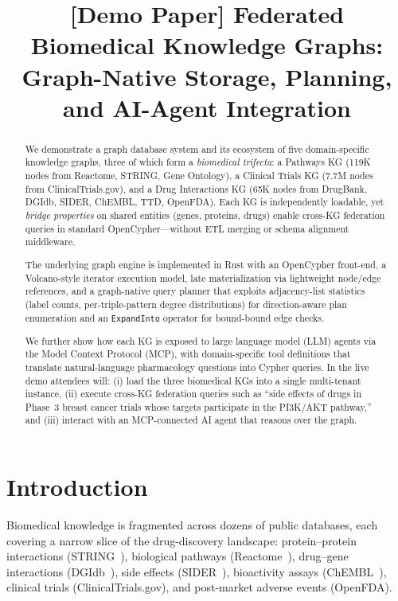 \documentclass[sigconf, anonymous, review]{acmart}
\begin{document}
\title{[Demo Paper] Federated Biomedical Knowledge Graphs:\\Graph-Native Storage, Planning, and AI-Agent Integration}

\begin{abstract}
We demonstrate a graph database system and its ecosystem of five
domain-specific knowledge graphs, three of which form a \emph{biomedical
trifecta}: a Pathways KG (119K nodes from Reactome, STRING, Gene
Ontology), a Clinical Trials KG (7.7M nodes from ClinicalTrials.gov),
and a Drug Interactions KG (65K nodes from DrugBank, DGIdb, SIDER,
ChEMBL, TTD, OpenFDA).  Each KG is independently loadable, yet
\emph{bridge properties} on shared entities (genes, proteins, drugs)
enable cross-KG federation queries in standard OpenCypher---without
ETL merging or schema alignment middleware.

The underlying graph engine is implemented in Rust with an
OpenCypher front-end, a Volcano-style iterator execution model,
late materialization via lightweight node/edge references, and a
graph-native query planner that exploits adjacency-list statistics
(label counts, per-triple-pattern degree distributions) for
direction-aware plan enumeration and an \texttt{ExpandInto}
operator for bound-bound edge checks.

We further show how each KG is exposed to large language model
(LLM) agents via the Model Context Protocol (MCP), with
domain-specific tool definitions that translate natural-language
pharmacology questions into Cypher queries.  In the live demo
attendees will: (i) load the three biomedical KGs into a single
multi-tenant instance, (ii) execute cross-KG federation queries
such as ``side effects of drugs in Phase~3 breast cancer trials
whose targets participate in the PI3K/AKT pathway,'' and
(iii) interact with an MCP-connected AI agent that reasons over
the graph.
\end{abstract}

\maketitle

\section{Introduction}\label{sec:intro}

Biomedical knowledge is fragmented across dozens of public databases,
each covering a narrow slice of the drug-discovery landscape:
protein--protein interactions (STRING~\cite{szklarczyk2023string}),
biological pathways (Reactome~\cite{gillespie2022reactome}), drug--gene
interactions (DGIdb~\cite{freshour2021dgidb}), side effects
(SIDER~\cite{kuhn2016sider}), bioactivity assays
(ChEMBL~\cite{zdrazil2024chembl}), clinical trials
(ClinicalTrials.gov), and post-market adverse events (OpenFDA).
\end{document}
